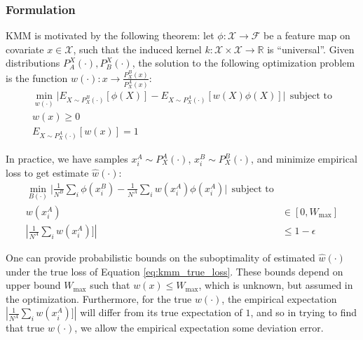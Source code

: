 \documentclass[8pt]{article}
\begin{document}
\subsubsection{Formulation}
KMM \cite{huang2006correcting} is motivated by the following theorem: let $\phi:\mathcal{X}
\rightarrow \mathcal{F}$ be a feature map on covariate $x \in
\mathcal{X}$, such that the induced kernel $k: \mathcal{X} \times
\mathcal{X} \rightarrow \mathbb{R}$ is ``universal''.  Given
distributions $P_A^X(\cdot),P_B^X(\cdot)$, the solution to the
following optimization problem is the function $w(\cdot):x \rightarrow
\tfrac{P_X^B(x)} {P_X^A(x)}:$
\begin{align}
\min_{w(\cdot)}\big\lvert E_{X\sim P_X^B(\cdot)}[\phi(X)] - E_{X \sim
  P_X^A(\cdot)}[w(X)\phi(X)]\big\lvert \ \ \text{subject to} \label{eq:kmm_true_loss}\\
w(x) \geq 0\\
E_{X\sim P_X^A(\cdot)}[w(x)] = 1
\end{align}

In practice, we have samples $x_i^A\sim P_X^A(\cdot)$,
$x_i^B\sim P_X^B(\cdot)$, and 
minimize empirical loss to get estimate $\hat{w}(\cdot)$:
\begin{align}
\min_{B(\cdot)}\big\lvert \tfrac{1}{N^B}\sum_i \phi(x_i^B) -
\tfrac{1}{N^A}\sum_i w(x_i^A)\phi(x_i^A)\big\lvert \ \ \text{subject
  to} \label{eq:kmm_empirical_loss}\\
w(x_i^A) &\in [0,W_{\max}] \\
|\tfrac{1}{N^A}\sum_i w(x_i^A)]| &\leq 1 - \epsilon
\end{align}

One
can provide probabilistic bounds on the suboptimality of estimated
$\hat{w}(\cdot)$ under the true loss of Equation
\ref{eq:kmm_true_loss}.  These bounds depend on upper bound $W_{\max}$
such that $w(x) \leq W_{\max}$, which is unknown, but assumed in the
optimization.  Furthermore, for the true $w(\cdot)$, the empirical expectation
$|\tfrac{1}{N^A}\sum_i w(x_i^A)]|$ will differ from its true
expectation of $1$, and so in trying to find that true $w(\cdot)$, we
allow the empirical expectation some deviation error.
\end{document}
